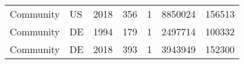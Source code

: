 \begin{tabular}{lllrrrr}
                                       Community &                                                 US &                                          2018 &                                                356 &                                                  1 &                                            8850024 &                                             156513 \\
                                       Community &                                                 DE &                                          1994 &                                                179 &                                                  1 &                                            2497714 &                                             100332 \\
                                       Community &                                                 DE &                                          2018 &                                                393 &                                                  1 &                                            3943949 &                                             152300 \\
\bottomrule
\end{tabular}
